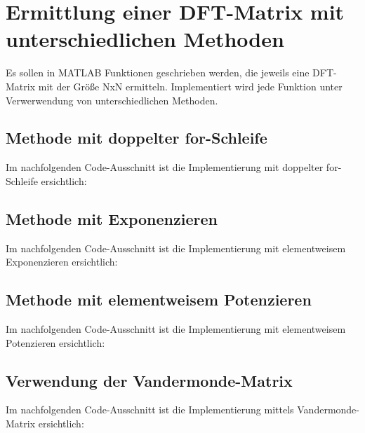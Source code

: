 \documentclass[12pt,a4paper]{article}
\begin{document}
	\pagebreak
	
	\section{Ermittlung einer DFT-Matrix mit unterschiedlichen Methoden}
	\label{sec:dftmat}
	Es sollen in MATLAB Funktionen geschrieben werden, die jeweils eine DFT-Matrix mit der Gr\"o{\ss}e NxN ermitteln. Implementiert wird jede Funktion unter Verwerwendung von unterschiedlichen Methoden.
	
	\subsection{Methode mit doppelter for-Schleife}
	Im nachfolgenden Code-Ausschnitt ist die Implementierung mit doppelter for-Schleife ersichtlich: \\
	

	\subsection{Methode mit Exponenzieren}
	Im nachfolgenden Code-Ausschnitt ist die Implementierung mit elementweisem Exponenzieren ersichtlich: \\
	
	
	\pagebreak

	\subsection{Methode mit elementweisem Potenzieren}
	Im nachfolgenden Code-Ausschnitt ist die Implementierung mit elementweisem Potenzieren ersichtlich: \\
	
	
	\subsection{Verwendung der Vandermonde-Matrix}
	Im nachfolgenden Code-Ausschnitt ist die Implementierung mittels Vandermonde-Matrix ersichtlich: \\
	
	
\end{document}
